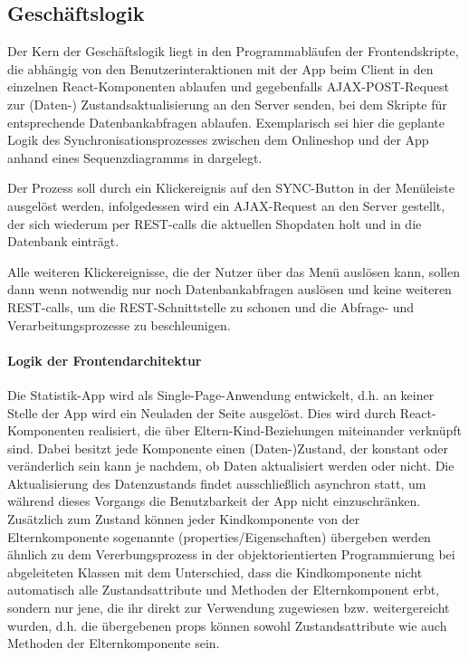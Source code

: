 \subsection{Geschäftslogik}
\label{sec:Geschaeftslogik}

Der Kern der Geschäftslogik liegt in den Programmabläufen der Frontendskripte, die abhängig von den Benutzerinteraktionen mit der App beim Client in den einzelnen React-Komponenten ablaufen und gegebenfalls \acs{AJAX}-POST-Request zur (Daten-) Zustandsaktualisierung an den Server senden, bei dem Skripte für entsprechende Datenbankabfragen ablaufen. Exemplarisch sei hier die geplante Logik des Synchronisationsprozesses zwischen dem Onlineshop und der App anhand eines Sequenzdiagramms in  dargelegt.

Der Prozess soll durch ein Klickereignis auf den SYNC-Button in der Menüleiste ausgelöst werden, infolgedessen wird ein AJAX-Request an den Server gestellt, der sich wiederum per REST-calls die aktuellen Shopdaten holt und in die Datenbank einträgt.

Alle weiteren Klickereignisse, die der Nutzer über das Menü auslösen kann, sollen dann wenn notwendig nur noch Datenbankabfragen auslösen und keine weiteren REST-calls, um die REST-Schnittstelle zu schonen und die Abfrage- und Verarbeitungsprozesse zu beschleunigen.

\paragraph{Logik der Frontendarchitektur}
Die Statistik-App wird als Single-Page-Anwendung entwickelt, d.h. an keiner Stelle der App wird ein Neuladen der Seite ausgelöst. Dies wird durch React-Komponenten realisiert, die über Eltern-Kind-Beziehungen miteinander verknüpft sind. Dabei besitzt jede Komponente einen (Daten-)Zustand, der konstant oder veränderlich sein kann je nachdem, ob Daten aktualisiert werden oder nicht. Die Aktualisierung des Datenzustands findet ausschließlich asynchron statt, um während dieses Vorgangs die Benutzbarkeit der App nicht einzuschränken. Zusätzlich zum Zustand können jeder Kindkomponente von der Elternkomponente sogenannte  (properties/Eigenschaften) übergeben werden ähnlich zu dem Vererbungsprozess in der objektorientierten Programmierung bei abgeleiteten Klassen mit dem Unterschied, dass die Kindkomponente nicht automatisch alle Zustandsattribute und Methoden der Elternkomponent erbt, sondern nur jene, die ihr direkt zur Verwendung zugewiesen bzw. weitergereicht wurden, d.h. die übergebenen props können sowohl Zustandsattribute wie auch Methoden der Elternkomponente sein.

